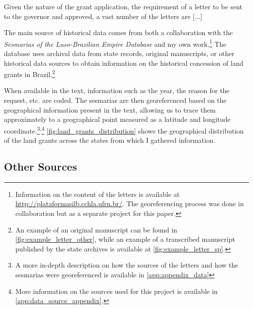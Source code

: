 \documentclass{article}
\begin{document}
Given the nature of the grant application, the requirement of a letter to be sent to the governor and approved, a vast number of the letters are [...]

The main source of historical data comes from both a collaboration with the \textit{Sesmarias of the Luso-Brazilian Empire Database} and my own work.\footnote{
  Information on the content of the letters is available at \url{http://plataformasilb.cchla.ufrn.br/}. The georeferencing process was done in collaboration but as a separate project for this paper.}
The database uses archival data from state records, original manuscripts, or other historical data sources to obtain information on the historical concession of land grants in Brazil.\footnote{An example of an original manuscript can be found in \autoref{fig:example_letter_other}, while an example of a transcribed manuscript published by the state archives is available at \autoref{fig:example_letter_sp}.}

When available in the text, information such as the year, the reason for the request, etc. are coded. 
The sesmarias are then georeferenced based on the geographical information present in the text, allowing us to trace them approximately to a geographical point measured as a latitude and longitude coordinate.\footnote{A more in-depth description on how the sources of the letters and how the sesmarias were georeferenced is available in \autoref{app:appendix_data}}\textsuperscript{,}\footnote{More information on the sources used for this project is available in \autoref{app:data_source_appendix}.} \autoref{fig:land_grants_distribution} shows the geographical distribution of the land grants across the states from which I gathered information. 

\subsection{Other Sources}
\end{document}
